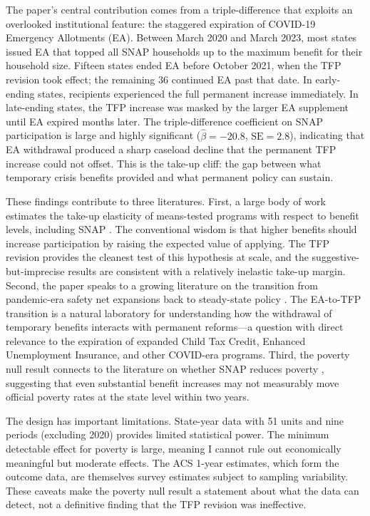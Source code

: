 \documentclass[12pt]{article}
\begin{document}
The paper's central contribution comes from a triple-difference that exploits an overlooked institutional feature: the staggered expiration of COVID-19 Emergency Allotments (EA). Between March 2020 and March 2023, most states issued EA that topped all SNAP households up to the maximum benefit for their household size. Fifteen states ended EA before October 2021, when the TFP revision took effect; the remaining 36 continued EA past that date. In early-ending states, recipients experienced the full permanent increase immediately. In late-ending states, the TFP increase was masked by the larger EA supplement until EA expired months later. The triple-difference coefficient on SNAP participation is large and highly significant ($\hat{\beta} = -20.8$, $\text{SE} = 2.8$), indicating that EA withdrawal produced a sharp caseload decline that the permanent TFP increase could not offset. This is the take-up cliff: the gap between what temporary crisis benefits provided and what permanent policy can sustain.

These findings contribute to three literatures. First, a large body of work estimates the take-up elasticity of means-tested programs with respect to benefit levels, including SNAP \citep{currie2006take, klerman2012understanding, ganong2019consumer}. The conventional wisdom is that higher benefits should increase participation by raising the expected value of applying. The TFP revision provides the cleanest test of this hypothesis at scale, and the suggestive-but-imprecise results are consistent with a relatively inelastic take-up margin. Second, the paper speaks to a growing literature on the transition from pandemic-era safety net expansions back to steady-state policy \citep{ganong2022spending, chetty2024economic, bitler2023pandemic}. The EA-to-TFP transition is a natural laboratory for understanding how the withdrawal of temporary benefits interacts with permanent reforms---a question with direct relevance to the expiration of expanded Child Tax Credit, Enhanced Unemployment Insurance, and other COVID-era programs. Third, the poverty null result connects to the literature on whether SNAP reduces poverty \citep{meyer2019accurate, garner2022supplemental}, suggesting that even substantial benefit increases may not measurably move official poverty rates at the state level within two years.

The design has important limitations. State-year data with 51 units and nine periods (excluding 2020) provides limited statistical power. The minimum detectable effect for poverty is large, meaning I cannot rule out economically meaningful but moderate effects. The ACS 1-year estimates, which form the outcome data, are themselves survey estimates subject to sampling variability. These caveats make the poverty null result a statement about what the data can detect, not a definitive finding that the TFP revision was ineffective.
\end{document}
